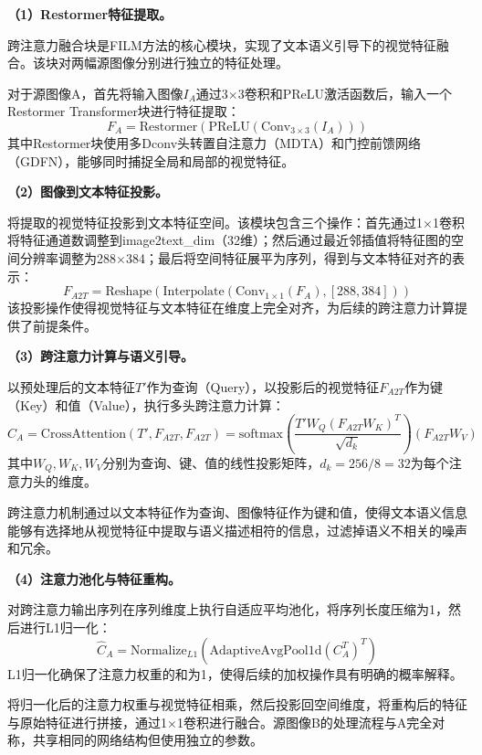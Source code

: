 \textbf{（1）Restormer特征提取。}

跨注意力融合块是FILM方法的核心模块，实现了文本语义引导下的视觉特征融合。该块对两幅源图像分别进行独立的特征处理。

对于源图像A，首先将输入图像$I_A$通过3$\times$3卷积和PReLU激活函数后，输入一个Restormer Transformer块进行特征提取：
\begin{equation}
    F_A = \text{Restormer}(\text{PReLU}(\text{Conv}_{3\times3}(I_A)))
\end{equation}
其中Restormer块使用多Dconv头转置自注意力（MDTA）和门控前馈网络（GDFN），能够同时捕捉全局和局部的视觉特征。

\textbf{（2）图像到文本特征投影。}

将提取的视觉特征投影到文本特征空间。该模块包含三个操作：首先通过1$\times$1卷积将特征通道数调整到image2text\_dim（32维）；然后通过最近邻插值将特征图的空间分辨率调整为288$\times$384；最后将空间特征展平为序列，得到与文本特征对齐的表示：
\begin{equation}
    F_{A2T} = \text{Reshape}(\text{Interpolate}(\text{Conv}_{1\times1}(F_A), [288, 384]))
\end{equation}
该投影操作使得视觉特征与文本特征在维度上完全对齐，为后续的跨注意力计算提供了前提条件。

\textbf{（3）跨注意力计算与语义引导。}

以预处理后的文本特征$T'$作为查询（Query），以投影后的视觉特征$F_{A2T}$作为键（Key）和值（Value），执行多头跨注意力计算：
\begin{equation}
    C_A = \text{CrossAttention}(T', F_{A2T}, F_{A2T}) = \text{softmax}\left(\frac{T' W_Q (F_{A2T} W_K)^T}{\sqrt{d_k}}\right)(F_{A2T} W_V)
\end{equation}
其中$W_Q, W_K, W_V$分别为查询、键、值的线性投影矩阵，$d_k = 256 / 8 = 32$为每个注意力头的维度。

跨注意力机制通过以文本特征作为查询、图像特征作为键和值，使得文本语义信息能够有选择地从视觉特征中提取与语义描述相符的信息，过滤掉语义不相关的噪声和冗余。

\textbf{（4）注意力池化与特征重构。}

对跨注意力输出序列在序列维度上执行自适应平均池化，将序列长度压缩为1，然后进行L1归一化：
\begin{equation}
    \hat{C}_A = \text{Normalize}_{L1}(\text{AdaptiveAvgPool1d}(C_A^T)^T)
\end{equation}
L1归一化确保了注意力权重的和为1，使得后续的加权操作具有明确的概率解释。

将归一化后的注意力权重与视觉特征相乘，然后投影回空间维度，将重构后的特征与原始特征进行拼接，通过1$\times$1卷积进行融合。源图像B的处理流程与A完全对称，共享相同的网络结构但使用独立的参数。

